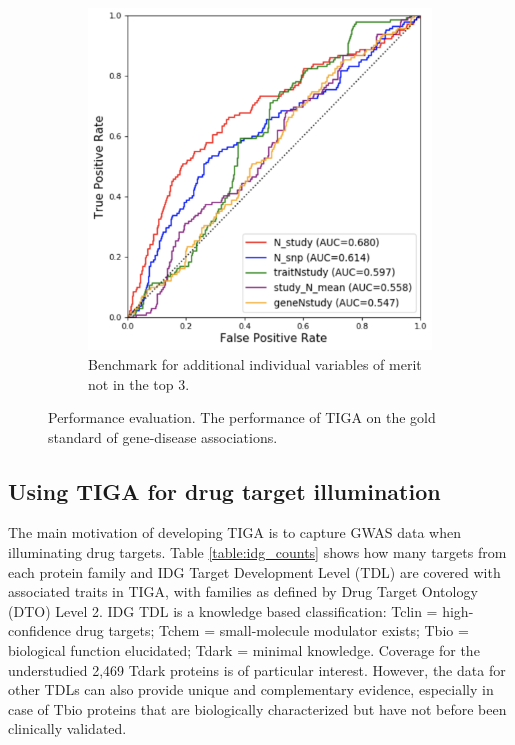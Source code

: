 \begin{figure}
\centering
\begin{subfigure}[c]{0.5\textwidth}
\includegraphics[width=\textwidth]{figures/tiga/SupFIG01_AdditionalROCs.png}
\caption{Benchmark for additional individual variables of merit not in the top 3.}
\label{fig:TIGA_Sup01}
\end{subfigure}
\caption{Performance evaluation. The performance of TIGA on the gold standard of gene-disease associations.}
\label{fig:TIGA_rocs}
\end{figure}

\subsection{Using TIGA for drug target illumination}

The main motivation of developing TIGA is to capture GWAS data when illuminating drug targets. Table \ref{table:idg_counts} shows how many targets from each protein family and IDG Target Development Level (TDL) are covered with associated traits in TIGA, with families as defined by Drug Target Ontology\cite{Lin2017-yb} (DTO) Level 2. IDG TDL is a knowledge based classification: Tclin = high-confidence drug targets; Tchem = small-molecule modulator exists; Tbio = biological function elucidated; Tdark = minimal knowledge\cite{Oprea2018-cp}. Coverage for the understudied 2,469 Tdark proteins is of particular interest. However, the data for other TDLs can also provide unique and complementary evidence, especially in case of Tbio proteins that are biologically characterized but have not before been clinically validated.


